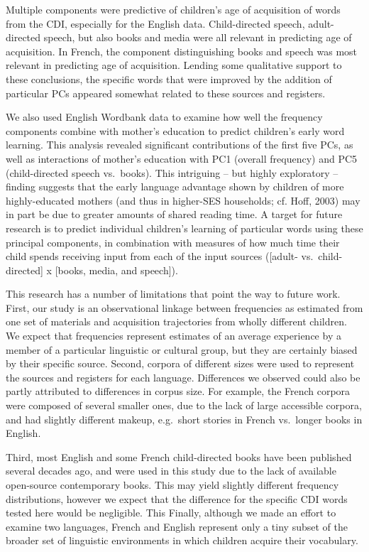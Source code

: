 \documentclass[10pt, letterpaper]{article}
\begin{document}
Multiple components were predictive of children's age of acquisition of
words from the CDI, especially for the English data. Child-directed
speech, adult-directed speech, but also books and media were all
relevant in predicting age of acquisition. In French, the component
distinguishing books and speech was most relevant in predicting age of
acquisition. Lending some qualitative support to these conclusions, the
specific words that were improved by the addition of particular PCs
appeared somewhat related to these sources and registers.

We also used English Wordbank data to examine how well the frequency
components combine with mother's education to predict children's early
word learning. This analysis revealed significant contributions of the
first five PCs, as well as interactions of mother's education with PC1
(overall frequency) and PC5 (child-directed speech vs.~books). This
intriguing -- but highly exploratory -- finding suggests that the early
language advantage shown by children of more highly-educated mothers
(and thus in higher-SES households; cf. Hoff, 2003) may in part be due
to greater amounts of shared reading time. A target for future research
is to predict individual children's learning of particular words using
these principal components, in combination with measures of how much
time their child spends receiving input from each of the input sources
({[}adult- vs.~child-directed{]} x {[}books, media, and speech{]}).

This research has a number of limitations that point the way to future
work. First, our study is an observational linkage between frequencies
as estimated from one set of materials and acquisition trajectories from
wholly different children. We expect that frequencies represent
estimates of an average experience by a member of a particular
linguistic or cultural group, but they are certainly biased by their
specific source. Second, corpora of different sizes were used to
represent the sources and registers for each language. Differences we
observed could also be partly attributed to differences in corpus size.
For example, the French corpora were composed of several smaller ones,
due to the lack of large accessible corpora, and had slightly different
makeup, e.g.~short stories in French vs.~longer books in English.

Third, most English and some French child-directed books have been
published several decades ago, and were used in this study due to the
lack of available open-source contemporary books. This may yield
slightly different frequency distributions, however we expect that the
difference for the specific CDI words tested here would be negligible.
This Finally, although we made an effort to examine two languages,
French and English represent only a tiny subset of the broader set of
linguistic environments in which children acquire their vocabulary.
\end{document}
